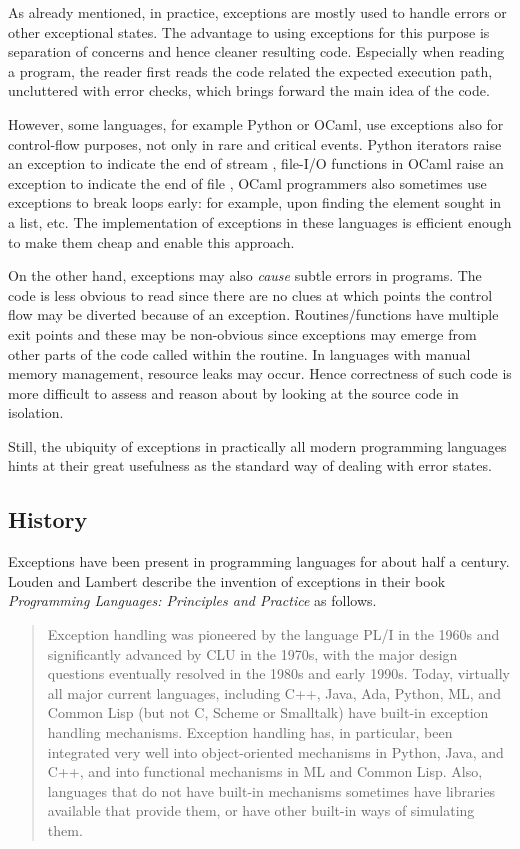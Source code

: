 As already mentioned, in practice, exceptions are mostly used to handle errors or
other exceptional states. The advantage to using
exceptions for this purpose is separation of concerns and hence cleaner resulting code.
Especially when reading a program, the reader first reads the code related the expected
execution path, uncluttered with error checks, which brings forward the main idea
of the code.

However, some languages, for example Python or OCaml, use exceptions also for control-flow
purposes, not only in rare and critical events. Python iterators raise an exception to
indicate the end of stream \cite{python:reference}, file-I/O functions in OCaml raise
an exception to indicate the end of file \cite{ocaml:reference}, OCaml programmers also
sometimes use exceptions to break loops early: for example, upon finding the element sought
in a list, etc. The implementation of
exceptions in these languages is efficient enough to make them cheap and enable this approach.

On the other hand, exceptions may also \emph{cause} subtle errors in programs. The code
is less obvious to read since there are no clues at which points the control flow may be diverted
because of an exception. Routines/functions have multiple exit points and these may
be non-obvious since exceptions may emerge from other parts of the code called within
the routine. In languages with manual memory management, resource leaks may occur.
Hence correctness of such code is more difficult to assess and reason about
by looking at the source code in isolation.

Still, the ubiquity of exceptions in practically all modern programming languages
hints at their great usefulness as the standard way of dealing with error states.

\subsection{History}

Exceptions have been present in programming languages for about half a century.
Louden and Lambert describe the invention of exceptions in their book
\emph{Programming Languages: Principles and Practice} as follows.

\begin{quote}
Exception handling was pioneered by the language PL/I in the 1960s and
significantly advanced by CLU in the 1970s, with the major design questions
eventually resolved in the 1980s and early 1990s. Today, virtually all major
current languages, including C++, Java, Ada, Python, ML, and Common Lisp (but
not C, Scheme or Smalltalk) have built-in exception handling mechanisms.
Exception handling has, in particular, been integrated very well into
object-oriented mechanisms in Python, Java, and C++, and into functional
mechanisms in ML and Common Lisp. Also, languages that do not have built-in
mechanisms sometimes have libraries available that provide them, or have other
built-in ways of simulating them. \cite[p.~423]{louden:languages}
\end{quote}

